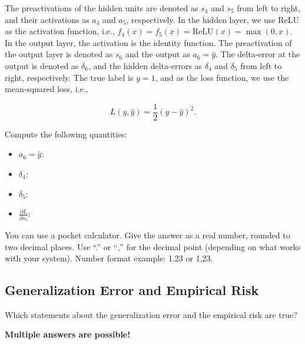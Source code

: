 \documentclass{article}
\begin{document}
The preactivations of the hidden units are denoted as \(s_4\) and \(s_5\) from left to right, and their activations as \(a_4\) and \(a_5\), respectively. In the hidden layer, we use ReLU as the activation function, i.e., \(f_4(x) = f_5(x) = \text{ReLU}(x) = \max(0, x)\). In the output layer, the activation is the identity function. The preactivation of the output layer is denoted as \(s_6\) and the output as \(a_6 = \hat{y}\). The delta-error at the output is denoted as \(\delta_6\), and the hidden delta-errors as \(\delta_4\) and \(\delta_5\) from left to right, respectively. The true label is \(y = 1\), and as the loss function, we use the mean-squared loss, i.e., 

\[
L(y, \hat{y}) = \frac{1}{2}(y - \hat{y})^2.
\]

Compute the following quantities:

\begin{itemize}
    \item \(a_6 = \hat{y}:\)
    \item \(\delta_4:\)
    \item \(\delta_5:\)
    \item \(\frac{\partial L}{\partial s_5}:\)
\end{itemize}

You can use a pocket calculator. Give the answer as a real number, rounded to two decimal places. Use ``.'' or ``,'' for the decimal point (depending on what works with your system). Number format example: 1.23 or 1,23.

\subsection*{Generalization Error and Empirical Risk}

Which statements about the generalization error and the empirical risk are true?

\textbf{Multiple answers are possible!}
\end{document}
